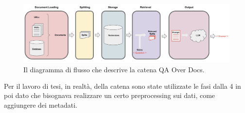 \begin{center}
    \begin{figure}[H]
        \includegraphics[height=0.18\pdfpageheight, width=0.8\pdfpagewidth]{images/QAchain.jpeg}
        \caption[QA Over Docs]{Il diagramma di flusso che descrive la catena QA Over Docs.}
        \label{fig:qaoverdocs}
    \end{figure}
\end{center}

Per il lavoro di tesi, in realtà, della catena sono state utilizzate le fasi dalla 4 in poi dato che bisognava realizzare un certo preprocessing sui dati, come aggiungere dei metadati.